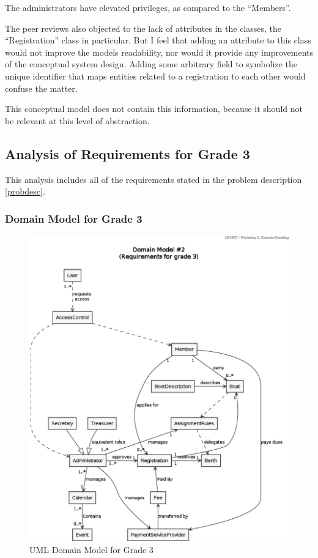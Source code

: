The administrators have elevated privileges, as compared to the ``Members''.


The peer reviews also objected to the lack of attributes in the classes, the
``Registration'' class in particular.  But I feel that adding an attribute to
this class would not improve the models readability, nor would it provide any
improvements of the conceptual system design. Adding some arbitrary field to
symbolize the unique identifier that maps entities related to a registration
to each other would confuse the matter.

This conceptual model does not contain this information, because it should not
be relevant at this level of abstraction.



\subsection{Analysis of Requirements for Grade 3}
This analysis includes all of the requirements stated in the problem
description \ref{probdesc}.

\subsubsection{Domain Model for Grade 3}
\begin{figure}[htbp]
  \centering
  \includegraphics[width=\linewidth]{uml/domain-model_2.eps}
  \caption{UML Domain Model for Grade 3}
  \label{fig:uml-domain2}
\end{figure}

